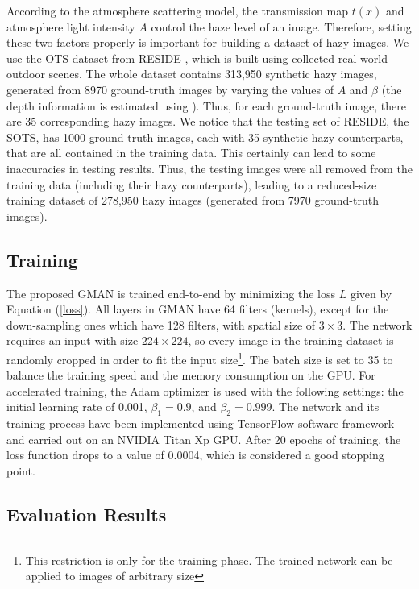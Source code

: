 \documentclass[journal]{IEEEtran}
\begin{document}
According to the atmosphere scattering model, the transmission map $t(x)$ and atmosphere light intensity $A$ control the haze level of an image. Therefore, setting these two factors properly is important for building a dataset of hazy images. We use the OTS dataset from RESIDE \cite{li2017reside}, which is built using collected real-world outdoor scenes. The whole dataset contains 313,950 synthetic hazy images, generated from 8970 ground-truth images by varying the values of $A$ and $\beta$ (the depth information is estimated using \cite{liu2016learning}).
  Thus, for each ground-truth image, there are 35 corresponding hazy images. We notice that the testing set of RESIDE, the SOTS, has 1000 ground-truth images, each with 35 synthetic hazy counterparts, that are all contained in the training data. This certainly can lead to some inaccuracies in testing results. Thus, the testing images were all removed from the training data (including their hazy counterparts), leading to a reduced-size training dataset of 278,950 hazy images (generated from 7970 ground-truth images).

\subsection{Training}

The proposed GMAN is trained end-to-end by minimizing the loss $L$ given by Equation (\ref{loss}). All layers in GMAN have 64 filters (kernels), except for the down-sampling ones which have 128 filters, with spatial size of $3\times3$. The network requires an input with size $224\times224$, so every image in the training dataset is randomly cropped in order to fit the input size\footnote{This restriction is only for the training phase. The trained network can be applied to images of arbitrary size}. The batch size is set to 35 to balance the training speed and the memory consumption on the GPU. For accelerated training, the Adam optimizer \cite{AdamOpt} is used with the following settings: the initial learning rate of 0.001, $\beta_1=0.9$, and $\beta_2=0.999$. The network and its training process have been implemented using TensorFlow software framework and carried out on an NVIDIA Titan Xp GPU. After 20 epochs of training, the loss function drops to a value of 0.0004, which is considered a good stopping point.

\subsection{Evaluation Results}
\end{document}
